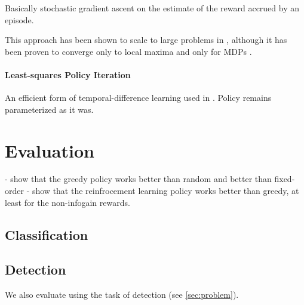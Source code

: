 \documentclass[runningheads]{llncs}
\begin{document}
Basically stochastic gradient ascent on the estimate of the reward accrued by an episode.

This approach has been shown to scale to large problems in \cite{Branavan2009}, although it has been proven to converge only to local maxima and only for MDPs \cite{Sutton2000}.


\paragraph{Least-squares Policy Iteration}
An efficient form of temporal-difference learning used in \cite{Kwok2004}.
Policy remains parameterized as it was.

\section{Evaluation} \label{sec:evaluation}
- show that the greedy policy works better than random and better than fixed-order
- show that the reinfrocement learning policy works better than greedy, at least for the non-infogain rewards.

\subsection{Classification}

\subsection{Detection}
We also evaluate using the task of detection (see \autoref{sec:problem}).




\end{document}
